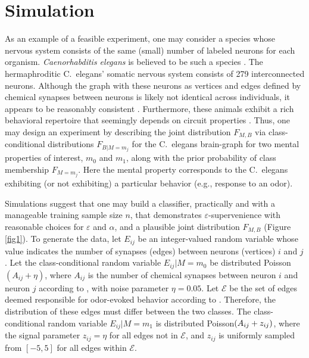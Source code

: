 \documentclass{article}
\providecommand{\mc}[1]{\mathcal{#1}}
\providecommand{\tr}[1]{\textcolor{black}{#1}}
\begin{document}

\section{Simulation} %
\label{sec:sim}

As an example of a feasible experiment, one may consider a species whose nervous system consists of the same (small) number of labeled neurons for each organism. {\it Caenorhabditis elegans} is believed to be such a species \cite{Durbin87}. The hermaphroditic C.~elegans' somatic nervous system consists of 279 interconnected neurons. Although the graph with these neurons as vertices and edges defined by chemical synapses between neurons is likely not identical across individuals, it appears to be reasonably consistent \cite{Durbin87}. Furthermore, these animals exhibit a rich behavioral repertoire that seemingly depends on circuit properties \cite{deBonoMaricq05}. Thus, one may design an experiment by describing the joint distribution $F_{M,B}$ via class-conditional distributions $F_{B|M=m_j}$ for the C.~elegans brain-graph for two mental properties of interest, $m_0$ and $m_1$, along with the prior probability of class membership $F_{M=m_j}$. Here the mental property corresponds to the C.~elegans exhibiting (or not exhibiting) a particular behavior (e.g., response to an odor).

Simulations suggest that one may build a classifier, practically and with a manageable training sample size $n$, that demonstrates $\varepsilon$-supervenience with reasonable choices for $\varepsilon$ and $\alpha$, and a plausible joint distribution $F_{M,B}$ (Figure \ref{fig1}). To generate the data, let $E_{ij}$ be an integer-valued random variable whose value indicates the number of synapses (edges) between neurons (vertices) $i$ and $j$.  Let the class-conditional random variable $E_{ij} | M=m_0$  be distributed Poisson$(A_{ij}+\eta)$, where $A_{ij}$ is the number of chemical synapses between neuron $i$ and neuron $j$ according to \cite{VarshneyChklovskii09}, with noise parameter $\eta=0.05$.  Let $\mc{E}$ be the set of edges deemed responsible for odor-evoked behavior according to \cite{ChalasaniBargmann07}.  Therefore, the distribution of these edges must differ between the two classes.  The class-conditional random variable $E_{ij} | M=m_1$ is distributed Poisson$(A_{ij}+ \tr{z_{ij}})$, where the signal parameter $z_{ij}=\eta$ for all edges not in $\mc{E}$, and $z_{ij}$ is uniformly sampled from $[-5,5]$ for all edges within $\mc{E}$.
\end{document}
